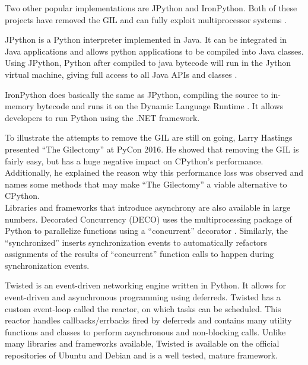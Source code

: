 Two other popular implementations are JPython and IronPython.
Both of these projects have removed the GIL and can fully exploit multiprocessor systems \cite{python2015global}.

JPython is a Python interpreter implemented in Java. It can be integrated in Java applications and allows python applications to be compiled into Java classes.
Using JPython, Python after compiled to java bytecode will run in the Jython virtual machine, giving full access to all Java APIs and classes \cite{jython2016why}.

IronPython does basically the same as JPython, compiling the source to in-memory bytecode and runs it on the Dynamic Language Runtime \cite{ironpython2014}.
It allows developers to run Python using the .NET framework.

To illustrate the attempts to remove the GIL are still on going, Larry Hastings presented ``The Gilectomy'' at PyCon 2016. He showed that removing the GIL is fairly easy, but has a huge negative impact on CPython's performance.
Additionally, he explained the reason why this performance loss was observed and names some methods that may make ``The Gilectomy'' a viable alternative to CPython.\\

Libraries and frameworks that introduce asynchrony are also available in large numbers.
Decorated Concurrency (DECO) uses the multiprocessing package of Python to parallelize functions using a ``concurrent'' decorator \cite{sherman2016deco}.
Similarly, the ``synchronized''  inserts synchronization events to automatically refactors assignments of the results of ``concurrent'' function calls to happen during synchronization events.

Twisted is an event-driven networking engine written in Python.
It allows for event-driven and asynchronous programming using deferreds.
Twisted has a custom event-loop called the reactor, on which tasks can be scheduled.
This reactor handles callbacks/errbacks fired by deferreds and contains many utility functions and classes to perform asynchronous and non-blocking calls.
Unlike many libraries and frameworks available, Twisted is available on the official repositories of Ubuntu and Debian and is a well tested, mature framework.


